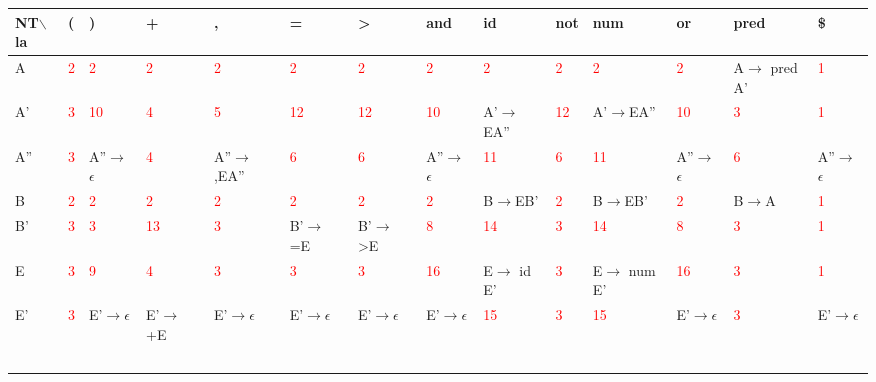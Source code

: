 \documentclass[11pt, a4paper]{article}
\begin{document}
\begin{table}[!ht]
    \centering
    \begin{tabular}{|l|l|l|l|l|l|l|l|l|l|l|l|l|l|}
    \hline
        NT$\backslash$la & ( & ) & + & , & = & > & and & id & not & num & or & pred & \$ \\ \hline
        A & \textcolor{red}{2} & \textcolor{red}{2} & \textcolor{red}{2} & \textcolor{red}{2} & \textcolor{red}{2} & \textcolor{red}{2} & \textcolor{red}{2} & \textcolor{red}{2} & \textcolor{red}{2} & \textcolor{red}{2} & \textcolor{red}{2} & A$\rightarrow$ pred A' & \textcolor{red}{1} \\ \hline
        A' & \textcolor{red}{3} & \textcolor{red}{1}\textcolor{red}{0} & \textcolor{red}{4} & \textcolor{red}{5} & \textcolor{red}{1}\textcolor{red}{2} & \textcolor{red}{1}\textcolor{red}{2} & \textcolor{red}{1}\textcolor{red}{0} & A'$\rightarrow$EA'' & \textcolor{red}{1}\textcolor{red}{2} & A'$\rightarrow$EA'' & \textcolor{red}{1}\textcolor{red}{0} & \textcolor{red}{3} & \textcolor{red}{1} \\ \hline
        A'' & \textcolor{red}{3} & A''$\rightarrow$$\epsilon$ & \textcolor{red}{4} & A''$\rightarrow$,EA'' & \textcolor{red}{6} & \textcolor{red}{6} & A''$\rightarrow$$\epsilon$ & \textcolor{red}{1}\textcolor{red}{1} & \textcolor{red}{6} & \textcolor{red}{1}\textcolor{red}{1} & A''$\rightarrow$$\epsilon$ & \textcolor{red}{6} & A''$\rightarrow$$\epsilon$ \\ \hline
        B & \textcolor{red}{2} & \textcolor{red}{2} & \textcolor{red}{2} & \textcolor{red}{2} & \textcolor{red}{2} & \textcolor{red}{2} & \textcolor{red}{2} & B$\rightarrow$EB' & \textcolor{red}{2} & B$\rightarrow$EB' & \textcolor{red}{2} & B$\rightarrow$A & \textcolor{red}{1} \\ \hline
        B' & \textcolor{red}{3} & \textcolor{red}{3} & \textcolor{red}{1}\textcolor{red}{3} & \textcolor{red}{3} & B'$\rightarrow$ =E & B'$\rightarrow$ >E & \textcolor{red}{8} & \textcolor{red}{1}\textcolor{red}{4} & \textcolor{red}{3} & \textcolor{red}{1}\textcolor{red}{4} & \textcolor{red}{8} & \textcolor{red}{3} & \textcolor{red}{1} \\ \hline
        E & \textcolor{red}{3} & \textcolor{red}{9} & \textcolor{red}{4} & \textcolor{red}{3} & \textcolor{red}{3} & \textcolor{red}{3} & \textcolor{red}{1}\textcolor{red}{6} & E$\rightarrow$ id E' & \textcolor{red}{3} & E$\rightarrow$ num E' & \textcolor{red}{1}\textcolor{red}{6} & \textcolor{red}{3} & \textcolor{red}{1} \\ \hline
        E' & \textcolor{red}{3} & E'$\rightarrow$$\epsilon$ & E'$\rightarrow$ +E & E'$\rightarrow$$\epsilon$ & E'$\rightarrow$$\epsilon$ & E'$\rightarrow$$\epsilon$ & E'$\rightarrow$$\epsilon$ & \textcolor{red}{1}\textcolor{red}{5} & \textcolor{red}{3} & \textcolor{red}{1}\textcolor{red}{5} & E'$\rightarrow$$\epsilon$ & \textcolor{red}{3} & E'$\rightarrow$$\epsilon$ \\ \hline
$$
\end{tabular}
\end{table}
\end{document}
